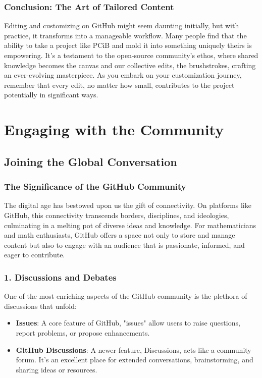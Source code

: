 \documentclass[a4paper,12pt]{book}
\begin{document}
\subsection*{Conclusion: The Art of Tailored Content}
Editing and customizing on GitHub might seem daunting initially, but with practice, it transforms into a manageable workflow. Many people find that the ability to take a project like PCiB and mold it into something uniquely theirs is empowering. It's a testament to the open-source community's ethos, where shared knowledge becomes the canvas and our collective edits, the brushstrokes, crafting an ever-evolving masterpiece. As you embark on your customization journey, remember that every edit, no matter how small, contributes to the project potentially in significant ways.

\chapter{Engaging with the Community}
\section*{Joining the Global Conversation}

\subsection*{The Significance of the GitHub Community}
The digital age has bestowed upon us the gift of connectivity. On platforms like GitHub, this connectivity transcends borders, disciplines, and ideologies, culminating in a melting pot of diverse ideas and knowledge. For mathematicians and math enthusiasts, GitHub offers a space not only to store and manage content but also to engage with an audience that is passionate, informed, and eager to contribute.

\subsection*{1. Discussions and Debates}
One of the most enriching aspects of the GitHub community is the plethora of discussions that unfold:

\begin{itemize}
    \item \textbf{Issues}: A core feature of GitHub, "issues" allow users to raise questions, report problems, or propose enhancements. 
    \item \textbf{GitHub Discussions}: A newer feature, Discussions, acts like a community forum. It's an excellent place for extended conversations, brainstorming, and sharing ideas or resources.
\end{itemize}
\end{document}
